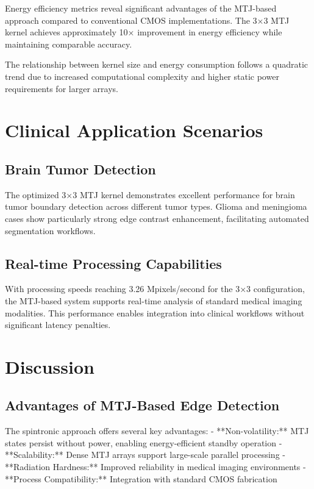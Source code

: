 \documentclass[conference]{IEEEtran}
\begin{document}
Energy efficiency metrics reveal significant advantages of the MTJ-based approach compared to conventional CMOS implementations. The 3×3 MTJ kernel achieves approximately 10× improvement in energy efficiency while maintaining comparable accuracy.

The relationship between kernel size and energy consumption follows a quadratic trend due to increased computational complexity and higher static power requirements for larger arrays.

\section{Clinical Application Scenarios}

\subsection{Brain Tumor Detection}

The optimized 3×3 MTJ kernel demonstrates excellent performance for brain tumor boundary detection across different tumor types. Glioma and meningioma cases show particularly strong edge contrast enhancement, facilitating automated segmentation workflows.

\subsection{Real-time Processing Capabilities}

With processing speeds reaching 3.26 Mpixels/second for the 3×3 configuration, the MTJ-based system supports real-time analysis of standard medical imaging modalities. This performance enables integration into clinical workflows without significant latency penalties.

\section{Discussion}

\subsection{Advantages of MTJ-Based Edge Detection}

The spintronic approach offers several key advantages:
- **Non-volatility:** MTJ states persist without power, enabling energy-efficient standby operation
- **Scalability:** Dense MTJ arrays support large-scale parallel processing
- **Radiation Hardness:** Improved reliability in medical imaging environments
- **Process Compatibility:** Integration with standard CMOS fabrication
\end{document}

